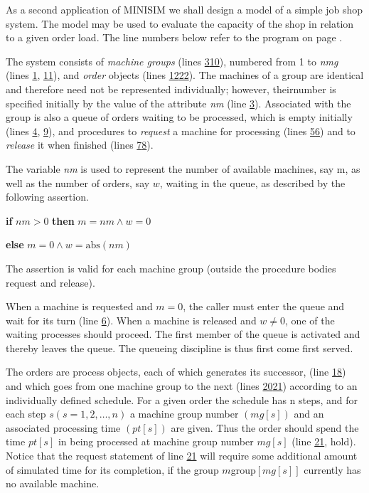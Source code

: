 As a second application of MINISIM we shall design a model of a simple job shop system. The model may be used to evaluate the capacity of the shop in relation to a given order load. The line numbers below refer to the program on page \pageref{pg:program-job-shop}.

The system consists of \textit{machine groups} (lines \hyperref[pg:program-job-shop-3]{3}\textendash \hyperref[pg:program-job-shop-10]{10}), numbered from 1 to \textit{nmg} (lines \hyperref[pg:program-job-shop-1]{1}, \hyperref[pg:program-job-shop-11]{11}), and \textit{order} objects (lines \hyperref[pg:program-job-shop-12]{12}\textendash \hyperref[pg:program-job-shop-22]{22}). The machines of a group are identical and therefore need not be represented individually; however, theirnumber is specified initially by the value of the attribute \textit{nm} (line \hyperref[pg:program-job-shop-3]{3}). Associated with the group is also a queue of orders waiting to be processed, which is empty initially (lines \hyperref[pg:program-job-shop-4]{4}, \hyperref[pg:program-job-shop-9]{9}), and procedures to \textit{request} a machine for processing (lines \hyperref[pg:program-job-shop-5]{5}\textendash \hyperref[pg:program-job-shop-6]{6}) and to \textit{release} it when finished (lines \hyperref[pg:program-job-shop-7]{7}\textendash \hyperref[pg:program-job-shop-8]{8}).

The variable \textit{nm} is used to represent the number of available machines, say m, as well as the number of orders, say $w$, waiting in the queue, as described by the following assertion.

\quad \textbf{if} $nm > 0$ \textbf{then} $m = nm \land w = 0$

\quad \textbf{else} $m = 0 \land w = \text{abs}(nm)$

\noindent
The assertion is valid for each machine group (outside the procedure bodies request and release).

When a machine is requested and $m = 0$, the caller must enter the queue and wait for its turn (line \hyperref[pg:program-job-shop-6]{6}). When a machine is released and $w \neq 0$, one of the waiting processes should proceed. The first member of the queue is activated and thereby leaves the queue. The queueing discipline is thus first come first served.

The orders are process objects, each of which generates its successor, (line \hyperref[pg:program-job-shop-18]{18}) and which goes from one machine group to the next (lines \hyperref[pg:program-job-shop-20]{20}\textendash \hyperref[pg:program-job-shop-21]{21}) according to an individually defined schedule. For a given order the schedule has n steps, and for each step $s(s = 1, 2, \dots, n)$ a machine group number $(mg[s])$ and an associated processing time $(pt[s])$ are given. Thus the order should spend the time $pt[s]$ in being processed at machine group number $mg[s]$ (line \hyperref[pg:program-job-shop-21]{21}, hold). Notice that the request statement of line \hyperref[pg:program-job-shop-21]{21} will require some additional amount of simulated time for its completion, if the group $m$group$[mg[s]]$ currently has no available machine.

